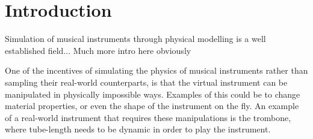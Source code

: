\documentclass[dvipsnames, reprint]{JASA}
\def\SWcomment[#1]{\textcolor{Bittersweet}{#1}}
\begin{document}



\section{\label{sec:introduction} Introduction}
Simulation of musical instruments through physical modelling is a well established field... 
\SWcomment[Much more intro here obviously]{}



One of the incentives of simulating the physics of musical instruments rather than sampling their real-world counterparts, is that the virtual instrument can be manipulated in physically impossible ways. Examples of this could be to change material properties, or even the shape of the instrument on the fly. An example of a real-world instrument that requires these manipulations is the trombone, where tube-length needs to be dynamic in order to play the instrument. %

\end{document}

